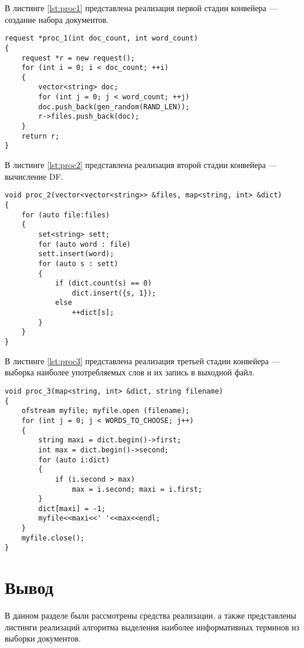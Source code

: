 В листинге \ref{lst:proc1} представлена реализация первой стадии конвейера --- создание набора документов.
\begin{center}
	\captionsetup{justification=raggedright,singlelinecheck=off}
	\begin{lstlisting}[label=lst:proc1,caption=Функция работы одного вспомогательного потока]
request *proc_1(int doc_count, int word_count)
{
	request *r = new request();
	for (int i = 0; i < doc_count; ++i)
	{
		vector<string> doc;
		for (int j = 0; j < word_count; ++j)
		doc.push_back(gen_random(RAND_LEN));
		r->files.push_back(doc);
	}
	return r;
}
\end{lstlisting}
\end{center}
\clearpage
В листинге \ref{lst:proc2} представлена реализация второй стадии конвейера --- вычисление DF.
\begin{center}
	\captionsetup{justification=raggedright,singlelinecheck=off}
\begin{lstlisting}[label=lst:proc2,caption=Функция работы одного вспомогательного потока]
void proc_2(vector<vector<string>> &files, map<string, int> &dict)
{
	for (auto file:files)
	{
		set<string> sett;
		for (auto word : file)
		sett.insert(word);
		for (auto s : sett)
		{
			if (dict.count(s) == 0)
				dict.insert({s, 1});
			else
				++dict[s];
		}
	}
}
\end{lstlisting}
\end{center}
В листинге \ref{lst:proc3} представлена реализация третьей стадии конвейера --- выборка наиболее употребляемых слов и их запись в выходной файл.
\begin{center}
	\captionsetup{justification=raggedright,singlelinecheck=off}
\begin{lstlisting}[label=lst:proc3,caption=Функция работы одного вспомогательного потока]
void proc_3(map<string, int> &dict, string filename)
{
	ofstream myfile; myfile.open (filename);
	for (int j = 0; j < WORDS_TO_CHOOSE; j++)
	{
		string maxi = dict.begin()->first;
		int max = dict.begin()->second;
		for (auto i:dict)
		{
			if (i.second > max)
				max = i.second; maxi = i.first;
		}
		dict[maxi] = -1;
		myfile<<maxi<<' '<<max<<endl;
	}
	myfile.close();
}
\end{lstlisting}
\end{center}


\section*{Вывод}
В данном разделе были рассмотрены средства реализации, а также представлены листинги реализаций алгоритма выделения наиболее информативных терминов из выборки документов.